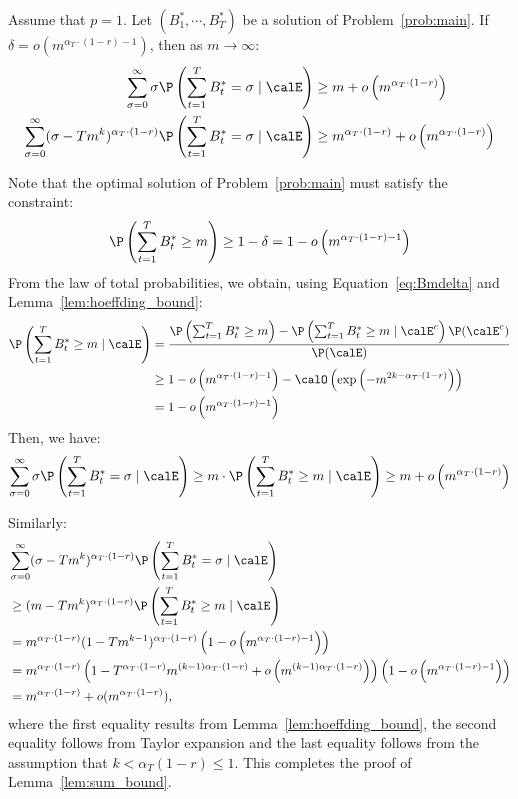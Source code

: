 \documentclass[blindrev]{informs3noheader}
\begin{document}
\begin{lemma}\label{lem:sum_bound}
Assume that $p=1$. Let $(B^*_1,\cdots,B^*_T)$ be a solution of Problem~\eqref{prob:main}. If $\delta = o\left(m^{\alpha_T\cdot(1-r)-1}\right)$, then as $m \to \infty$:
\begin{align*}
\sum_{\sigma=0}^\infty \sigma \P\left(\sum_{t=1}^T B_t^*=\sigma \mid \calE\right) & \geq m + o\left(m^{\alpha_T\cdot(1-r)}\right)\\
\sum_{\sigma=0}^\infty(\sigma-Tm^k)^{\alpha_T\cdot(1-r)}\P\left(\sum_{t=1}^T B_t^*=\sigma\mid \calE \right)&\geq m^{\alpha_T\cdot(1-r)}+o\left(m^{\alpha_T\cdot(1-r)}\right)
\end{align*}
\end{lemma}
Note that the optimal solution of Problem~\eqref{prob:main} must satisfy the constraint:
\begin{equation}
\P\left(\sum_{t=1}^T B_t^*\geq m\right)\geq 1-\delta = 1-o\left(m^{\alpha_T\cdot(1-r)-1}\right)\label{eq:Bmdelta}
\end{equation}
From the law of total probabilities, we obtain, using Equation~\eqref{eq:Bmdelta} and Lemma~\ref{lem:hoeffding_bound}:
\begin{align*}
\P\left(\sum_{t=1}^T B_t^*\geq m \mid \calE\right)
&=\frac{\P\left(\sum_{t=1}^T B_t^*\geq m\right)-\P\left(\sum_{t=1}^T B_t^*\geq m\mid \calE^c \right)\P(\calE^c)}{\P(\calE)}\\
&\geq1-o\left(m^{\alpha_T\cdot(1-r)-1}\right)-\calO\left(\exp\left(-m^{2k-\alpha_T\cdot(1-r)}\right)\right)\\
&=1-o\left(m^{\alpha_T\cdot(1-r)-1}\right)
\end{align*}
Then, we have:
\begin{equation*}
\sum_{\sigma=0}^\infty \sigma \P\left(\sum_{t=1}^T B_t^*=\sigma \mid \calE\right)\geq m\cdot \P\left(\sum_{t=1}^T B_t^*\geq m \mid \calE\right)\geq m+o\left(m^{\alpha_T\cdot(1-r)}\right)
\end{equation*}

Similarly:
\begin{align*}
&\sum_{\sigma=0}^\infty(\sigma-Tm^k)^{\alpha_T\cdot(1-r)}\P\left(\sum_{t=1}^T B_t^*
=\sigma\mid \calE \right)\\
&\geq (m-Tm^k)^{\alpha_T\cdot(1-r)}\P\left(\sum_{t=1}^T B_t^*\geq m\mid \calE \right)\\
&= m^{\alpha_T\cdot(1-r)}(1-Tm^{k-1})^{\alpha_T\cdot(1-r)}\left(1-o\left(m^{\alpha_T\cdot(1-r)-1}\right)\right)\\
&= m^{\alpha_T\cdot(1-r)}\left(1-T^{\alpha_T\cdot(1-r)}m^{(k-1)\alpha_T\cdot(1-r)}+o\left(m^{(k-1)\alpha_T\cdot(1-r)}\right)\right)\left(1-o\left(m^{\alpha_T\cdot(1-r)-1}\right)\right)\\
&=m^{\alpha_T\cdot(1-r)}+o(m^{\alpha_T\cdot(1-r)}),
\end{align*}
where the first equality results from Lemma~\ref{lem:hoeffding_bound}, the second equality follows from Taylor expansion and the last equality follows from the assumption that $k<\alpha_T(1-r)\leq1$.
This completes the proof of Lemma~\ref{lem:sum_bound}.\hfill\Halmos
\end{document}
